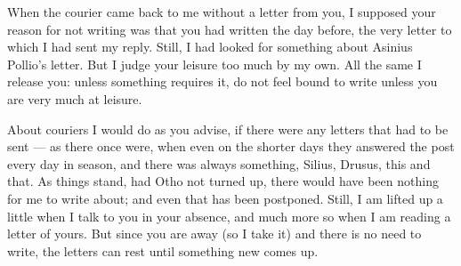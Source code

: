 

 When the courier came back to me without a letter from you, I supposed your reason for not writing was that you had written the day before, the very letter to which I had sent my reply. Still, I had looked for something about Asinius Pollio's letter. But I judge your leisure too much by my own. All the same I release you: unless something requires it, do not feel bound to write unless you are very much at leisure.

 About couriers I would do as you advise, if there were any letters that had to be sent --- as there once were, when even on the shorter days they answered the post every day in season, and there was always something, Silius, Drusus, this and that. As things stand, had Otho not turned up, there would have been nothing for me to write about; and even that has been postponed. Still, I am lifted up a little when I talk to you in your absence, and much more so when I am reading a letter of yours. But since you are away (so I take it) and there is no need to write, the letters can rest until something new comes up.
